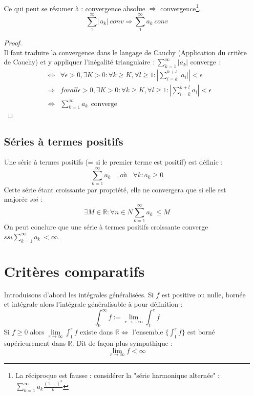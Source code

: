 \documentclass[british,french,11pt, a4paper, openany]{book}
\begin{document}
\ \\
		
Ce qui peut se résumer à : convergence absolue $\Rightarrow$ convergence\footnote{La réciproque est fausse : considérer la "série harmonique alternée" : $\sum_{k=1}^\infty a_k \frac{(1-)^k}{k}$}. $$\sum_1^{\infty}|a_k|\ conv\Rightarrow \sum_1^{\infty}a_k\ conv$$
\begin{proof}
	\ \\
	Il faut traduire la convergence dans le langage de Cauchy (Application du critère de Cauchy) et y appliquer l'inégalité triangulaire : $\sum_{k=1}^\infty |a_k|$ converge :
	\begin{eqnarray}
		&\Leftrightarrow & \forall \epsilon > 0, \exists K > 0 : \forall k \geq K, \forall l \geq 1 : \left|\sum_{i=k}^{k+l} |a_i| \right| < \epsilon\\
		&\Rightarrow & forall \epsilon > 0, \exists K > 0 : \forall k \geq K, \forall l \geq 1 : \left|\sum_{i=k}^{k+l} a_i \right| < \epsilon\\
		&\Leftrightarrow & \sum_{k=1}^\infty a_k\ \ \text{converge}
	\end{eqnarray}
\end{proof}
		
		
\subsection{Séries à termes positifs}
Une série à termes positifs (= si le premier terme est positif) est définie :
\begin{equation}
	\sum_{k=1}^\infty a_k\ \ \ \ \ \ où\ \ \ \ \forall k : a_k \geq 0
\end{equation}
Cette série étant croissante par propriété, elle ne convergera que si elle est majorée $ssi$ : 
\begin{equation}
	\exists M \in \mathbb{R} : \forall n \in N \sum_{k=1}^\infty a_k\ \leq M
\end{equation}  On peut conclure que une série à termes positifs croissante converge $ssi \sum_{k=1}^\infty a_k\ < \infty$.
		
\section{Critères comparatifs}
Introduisons d'abord les intégrales généralisées. Si $f$ est positive ou nulle, bornée et intégrale alors l'intégrale généralisable à pour définition :
\begin{equation}
	\int_0^\infty f := \lim\limits_{r \rightarrow +\infty}  \int_1^r f
\end{equation}
Si $f \geq 0$ alors $\lim\limits_{r \rightarrow \infty}  \int_1^r f$ existe dans $\mathbb{R} \Leftrightarrow$ l'ensemble $\{\int_1^r f\}$ est borné supérieurement dans $\mathbb{R}$. Dit de façon plus sympathique :
\begin{equation}
	\lim\limits_{r \rightarrow \infty} f < \infty
\end{equation}
\end{document}
